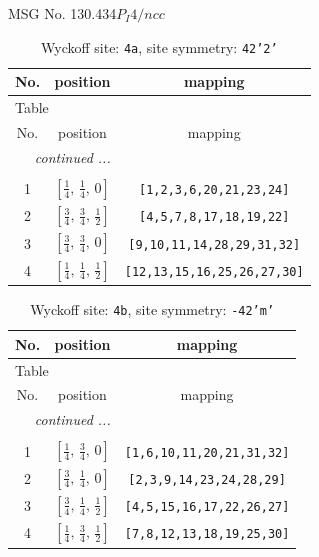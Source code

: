 \documentclass[fleqn,8pt]{jsarticle}
\begin{document}
\setcounter{MaxMatrixCols}{32}

\renewcommand{\tablename}{Table~}
\renewcommand{\figurename}{Figure~}
\begin{center}
\LARGE
MSG No. 130.434\quad$P_{I}4/ncc$
\end{center}
\renewcommand{\arraystretch}{1.2}
\begin{longtable}{ccc}
\caption{Wyckoff site: {\tt 4a}, site symmetry: {\tt 42'2'}}
 \\
 \hline \hline
No. & position & mapping \\ \hline \endfirsthead

\multicolumn{2}{l}{\tablename\ \thetable{}} \\
 \hline \hline
No. & position & mapping \\ \hline \endhead

 \hline \hline
\multicolumn{2}{r}{\footnotesize\it continued ...} \\ \endfoot

 \hline \hline
\multicolumn{2}{r}{} \\ \endlastfoot

1 & $\left[ \frac{1}{4},\, \frac{1}{4},\, 0 \right]$ & {\tt [1,2,3,6,20,21,23,24]} \\ \hline
2 & $\left[ \frac{3}{4},\, \frac{3}{4},\, \frac{1}{2} \right]$ & {\tt [4,5,7,8,17,18,19,22]} \\ \hline
3 & $\left[ \frac{3}{4},\, \frac{3}{4},\, 0 \right]$ & {\tt [9,10,11,14,28,29,31,32]} \\ \hline
4 & $\left[ \frac{1}{4},\, \frac{1}{4},\, \frac{1}{2} \right]$ & {\tt [12,13,15,16,25,26,27,30]} \\
\end{longtable}
\renewcommand{\arraystretch}{1.2}
\begin{longtable}{ccc}
\caption{Wyckoff site: {\tt 4b}, site symmetry: {\tt -42'm'}}
 \\
 \hline \hline
No. & position & mapping \\ \hline \endfirsthead

\multicolumn{2}{l}{\tablename\ \thetable{}} \\
 \hline \hline
No. & position & mapping \\ \hline \endhead

 \hline \hline
\multicolumn{2}{r}{\footnotesize\it continued ...} \\ \endfoot

 \hline \hline
\multicolumn{2}{r}{} \\ \endlastfoot

1 & $\left[ \frac{1}{4},\, \frac{3}{4},\, 0 \right]$ & {\tt [1,6,10,11,20,21,31,32]} \\ \hline
2 & $\left[ \frac{3}{4},\, \frac{1}{4},\, 0 \right]$ & {\tt [2,3,9,14,23,24,28,29]} \\ \hline
3 & $\left[ \frac{3}{4},\, \frac{1}{4},\, \frac{1}{2} \right]$ & {\tt [4,5,15,16,17,22,26,27]} \\ \hline
4 & $\left[ \frac{1}{4},\, \frac{3}{4},\, \frac{1}{2} \right]$ & {\tt [7,8,12,13,18,19,25,30]} \\
\end{longtable}
\end{document}
